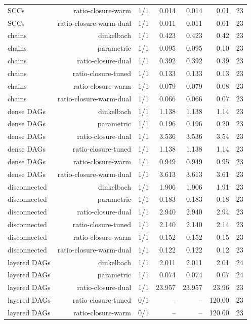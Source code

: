 {\begin{longtable}{lrrrrrr}
SCCs & ratio-closure-warm & 1/1 & 0.014 & 0.014 & 0.01 & 23 \\
SCCs & ratio-closure-warm-dual & 1/1 & 0.011 & 0.011 & 0.01 & 23 \\
chains & dinkelbach & 1/1 & 0.423 & 0.423 & 0.42 & 23 \\
chains & parametric & 1/1 & 0.095 & 0.095 & 0.10 & 23 \\
chains & ratio-closure-dual & 1/1 & 0.392 & 0.392 & 0.39 & 23 \\
chains & ratio-closure-tuned & 1/1 & 0.133 & 0.133 & 0.13 & 23 \\
chains & ratio-closure-warm & 1/1 & 0.079 & 0.079 & 0.08 & 23 \\
chains & ratio-closure-warm-dual & 1/1 & 0.066 & 0.066 & 0.07 & 23 \\
dense DAGs & dinkelbach & 1/1 & 1.138 & 1.138 & 1.14 & 23 \\
dense DAGs & parametric & 1/1 & 0.196 & 0.196 & 0.20 & 23 \\
dense DAGs & ratio-closure-dual & 1/1 & 3.536 & 3.536 & 3.54 & 23 \\
dense DAGs & ratio-closure-tuned & 1/1 & 1.138 & 1.138 & 1.14 & 23 \\
dense DAGs & ratio-closure-warm & 1/1 & 0.949 & 0.949 & 0.95 & 23 \\
dense DAGs & ratio-closure-warm-dual & 1/1 & 3.613 & 3.613 & 3.61 & 23 \\
disconnected & dinkelbach & 1/1 & 1.906 & 1.906 & 1.91 & 23 \\
disconnected & parametric & 1/1 & 0.183 & 0.183 & 0.18 & 23 \\
disconnected & ratio-closure-dual & 1/1 & 2.940 & 2.940 & 2.94 & 23 \\
disconnected & ratio-closure-tuned & 1/1 & 2.140 & 2.140 & 2.14 & 23 \\
disconnected & ratio-closure-warm & 1/1 & 0.152 & 0.152 & 0.15 & 23 \\
disconnected & ratio-closure-warm-dual & 1/1 & 0.122 & 0.122 & 0.12 & 23 \\
layered DAGs & dinkelbach & 1/1 & 2.011 & 2.011 & 2.01 & 24 \\
layered DAGs & parametric & 1/1 & 0.074 & 0.074 & 0.07 & 24 \\
layered DAGs & ratio-closure-dual & 1/1 & 23.957 & 23.957 & 23.96 & 23 \\
layered DAGs & ratio-closure-tuned & 0/1 & -- & -- & 120.00 & 23 \\
layered DAGs & ratio-closure-warm & 0/1 & -- & -- & 120.00 & 23 \\

\end{longtable}}
